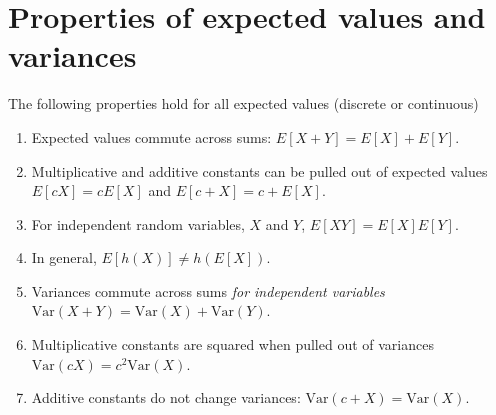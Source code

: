 \documentclass[12pt]{article}
\begin{document}
\section{Properties of expected values and variances}
The following properties hold for all expected values (discrete or continuous)
\begin{enumerate}[1.]
\item Expected values commute across sums: $E[X + Y] = E[X] + E[Y]$.
\item Multiplicative and additive constants can be pulled out 
  of expected values $E[cX] = cE[X]$ and $E[c + X] = c + E[X]$.
\item For independent random variables, $X$ and $Y$, $E[XY] = E[X]E[Y]$.
\item In general, $E[h(X)] \neq h(E[X])$.
\item Variances commute across sums {\em for independent variables}
  $\mathrm{Var}(X + Y) = \mathrm{Var}(X) + \mathrm{Var}(Y)$.
\item Multiplicative constants are squared when pulled out of variances
$\mathrm{Var}(cX) = c^2 \mathrm{Var}(X)$.
\item Additive constants do not change variances: $\mathrm{Var}(c + X)
  = \mathrm{Var}(X)$.
\end{enumerate}
\end{document}
